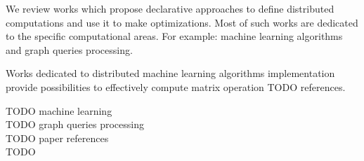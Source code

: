 We review works which propose declarative approaches to define distributed computations and use it to make optimizations.
Most of such works are dedicated to the specific computational areas.
For example: machine learning algorithms and graph queries processing.

Works dedicated to distributed machine learning algorithms implementation provide possibilities to effectively compute matrix operation TODO references.

TODO machine learning \\
TODO graph queries processing \\
TODO paper references \\
TODO
